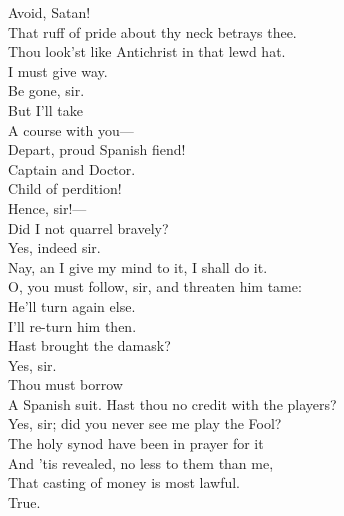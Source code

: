 \documentclass[a4paper,oneside,12pt]{memoir}
\begin{document}
\begin{drama*}
\persecutionspeaks {} Avoid, Satan!\\
That ruff of pride about thy neck betrays thee.\\
Thou look'st like Antichrist in that lewd hat.\\
\surlyspeaks I must give way.\\
\kastrilspeaks {} Be gone, sir.\\
\surlyspeaks {} But I'll take\\
A course with you---\\
\persecutionspeaks {} Depart, proud Spanish fiend!\\
\surlyspeaks Captain and Doctor.\\
\persecutionspeaks {} Child of perdition!\\
\kastrilspeaks Hence, sir!---\\
 Did I not quarrel bravely?\\
\facespeaks {} Yes, indeed sir.\\
\kastrilspeaks Nay, an I give my mind to it, I shall do it.\\
\facespeaks O, you must follow, sir, and threaten him tame:\\
He'll turn again else.\\
\kastrilspeaks {} I'll re-turn him then.\\
\facespeaks Hast brought the damask?\\
\druggerspeaks {} Yes, sir.\\
\facespeaks {} Thou must borrow\\
A Spanish suit. Hast thou no credit with the players?\\
\druggerspeaks Yes, sir; did you never see me play the Fool?\\
\persecutionspeaks The holy synod have been in prayer for it\\
And 'tis revealed, no less to them than me,\\
That casting of money is most lawful.\\
\subtlespeaks {} True.\\

\end{drama*}
\end{document}
